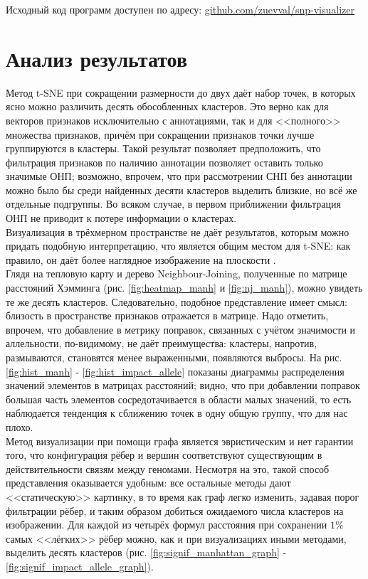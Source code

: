 \documentclass[main.tex]{subfiles}
\begin{document}
Исходный код программ доступен по адресу: \href{https://github.com/zuevval/snp-visualizer}{github.com/zuevval/snp-visualizer}

\newpage

\section{Анализ результатов}
Метод t-SNE при сокращении размерности до двух даёт набор точек, в которых ясно можно различить десять обособленных кластеров. Это верно как для векторов признаков исключительно с аннотациями, так и для <<полного>> множества признаков, причём при сокращении признаков точки лучше группируются в кластеры.
Такой результат позволяет предположить, что фильтрация признаков по наличию аннотации позволяет оставить только значимые ОНП; возможно, впрочем, что при рассмотрении СНП без аннотации можно было бы среди найденных десяти кластеров выделить близкие, но всё же отдельные подгруппы. Во всяком случае, в первом приближении фильтрация ОНП не приводит к потере информации о кластерах.\\
Визуализация в трёхмерном пространстве не даёт результатов, которым можно придать подобную интерпретацию, что является общим местом для t-SNE: как правило, он даёт более наглядное изображение на плоскости \cite{tsne}. \\

Глядя на тепловую карту и дерево Neighbour-Joining, полученные по матрице расстояний Хэмминга (рис. \ref{fig:heatmap_manh} и \ref{fig:nj_manh}), можно увидеть те же десять кластеров. Следовательно, подобное представление имеет смысл: близость в пространстве признаков отражается в матрице.
Надо отметить, впрочем, что добавление в метрику поправок, связанных с учётом значимости и аллельности, по-видимому, не даёт преимущества: кластеры, напротив, размываются, становятся менее выраженными, появляются выбросы. На рис. \ref{fig:hist_manh} - \ref{fig:hist_impact_allele} показаны диаграммы распределения значений элементов в матрицах расстояний; видно, что при добавлении поправок большая часть элементов сосредотачивается в области малых значений, то есть наблюдается тенденция к сближению точек в одну общую группу, что для нас плохо. \\

Метод визуализации при помощи графа является эвристическим и нет гарантии того, что конфигурация рёбер и вершин соответствуют существующим в действительности связям между геномами. Несмотря на это, такой способ представления оказывается удобным: все остальные методы дают <<статическую>> картинку, в то время как граф легко изменить, задавая порог фильтрации рёбер, и таким образом добиться ожидаемого числа кластеров на изображении. Для каждой из четырёх формул расстояния при сохранении $1\%$ самых <<лёгких>> рёбер можно, как и при визуализациях иными методами, выделить десять кластеров (рис. \ref{fig:signif_manhattan_graph} - \ref{fig:signif_impact_allele_graph}).
\end{document}
